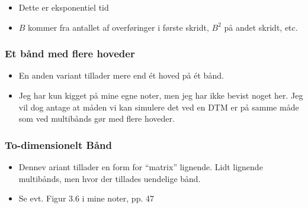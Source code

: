 \begin{frame}[allowframebreaks]
\begin{itemize}
    \item Dette er eksponentiel tid
    \item $B$ kommer fra antallet af overføringer i første skridt, $B^{2}$ på andet skridt, etc.
  \end{itemize}


\end{frame}

\begin{frame}[allowframebreak]
  \frametitle{Et bånd med flere hoveder}
\begin{itemize}
  \item En anden variant tillader mere end ét hoved på ét bånd.
  \item Jeg har kun kigget på mine egne noter, men jeg har ikke bevist noget her. Jeg vil dog antage at måden vi kan simulere det ved en DTM er på samme måde som ved multibånds gør med flere hoveder.
\end{itemize}
\end{frame}

\begin{frame}[allowframebreaks]
  \frametitle{To-dimensionelt Bånd}
 \begin{itemize}
   \item Dennev ariant tillader en form for ``matrix'' lignende. Lidt lignende multibånds, men hvor der tillades uendelige bånd.
   \item Se evt. Figur 3.6 i mine noter, pp. 47
 \end{itemize}
\end{frame}

